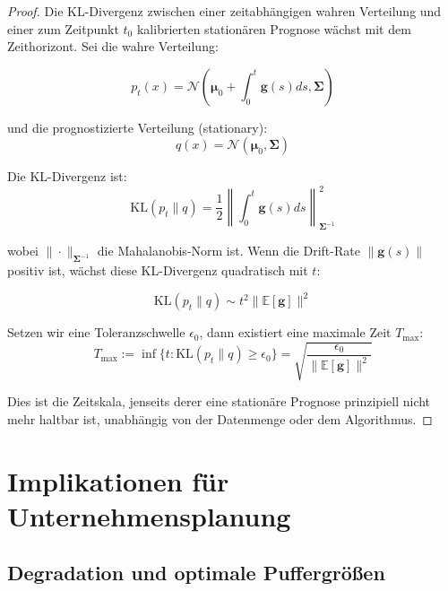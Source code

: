 \documentclass[a4paper, 12pt, twoside, openright]{report}
\theoremstyle{definition}
\theoremstyle{definition}
\newcommand{\KL}{\mathrm{KL}}
\begin{document}
\begin{proof}
Die KL-Divergenz zwischen einer zeitabhängigen wahren Verteilung und einer zum Zeitpunkt $t_0$ kalibrierten stationären Prognose wächst mit dem Zeithorizont. Sei die wahre Verteilung:

\begin{equation}
p_t(x) = \mathcal{N}(\bm{\mu}_0 + \int_0^t \bm{g}(s) ds, \bm{\Sigma})
\end{equation}

und die prognostizierte Verteilung (stationary):
\begin{equation}
q(x) = \mathcal{N}(\bm{\mu}_0, \bm{\Sigma})
\end{equation}

Die KL-Divergenz ist:
\begin{equation}
\KL(p_t \parallel q) = \frac{1}{2} \left\| \int_0^t \bm{g}(s) ds \right\|_{\bm{\Sigma}^{-1}}^2
\end{equation}

wobei $\| \cdot \|_{\bm{\Sigma}^{-1}}$ die Mahalanobis-Norm ist. Wenn die Drift-Rate $\| \bm{g}(s) \|$ positiv ist, wächst diese KL-Divergenz quadratisch mit $t$:

\begin{equation}
\KL(p_t \parallel q) \sim t^2 \| \mathbb{E}[\bm{g}] \|^2
\end{equation}

Setzen wir eine Toleranzschwelle $\epsilon_0$, dann existiert eine maximale Zeit $T_{\max}$:
\begin{equation}
T_{\max} := \inf\{t : \KL(p_t \parallel q) \geq \epsilon_0 \} = \sqrt{\frac{\epsilon_0}{\| \mathbb{E}[\bm{g}] \|^2}}
\end{equation}

Dies ist die Zeitskala, jenseits derer eine stationäre Prognose prinzipiell nicht mehr haltbar ist, unabhängig von der Datenmenge oder dem Algorithmus.
\end{proof}

\section{Implikationen für Unternehmensplanung}
\label{sec:planung}

\subsection{Degradation und optimale Puffergrößen}
\end{document}
